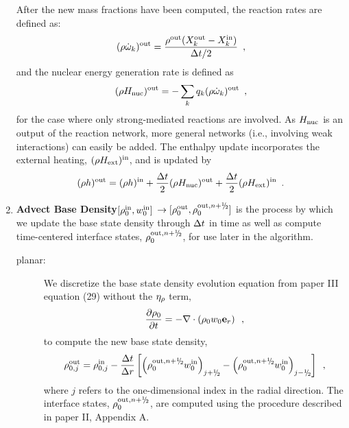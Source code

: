 \begin{enumerate}
After the new mass fractions have been computed, the reaction rates are defined as:
\begin{equation}
(\rho\dot{\omega}_k)^{\mathrm{out}} = \frac{\rho^{\mathrm{out}} ( X_k^{\mathrm{out}} - X_k^{\mathrm{in}})}{\Delta t /2} \enskip,
\end{equation}
and the nuclear energy generation rate is defined as
\begin{equation}
(\rho{H_{\rm nuc}})^{\mathrm{out}} = -\sum_k q_k (\rho\dot{\omega}_k)^{\mathrm{out}} \enskip,
\end{equation}
for the case where only strong-mediated reactions are involved.  As
${H_{\rm nuc}}$ is an output of the reaction network, more general networks
(i.e., involving weak interactions) can easily be added.  The enthalpy
update incorporates the external heating, $(\rho{H_{\rm ext}})^{\mathrm{in}}$, and is
updated by
\begin{equation}
(\rho h)^{\mathrm{out}} = 
(\rho h)^{\mathrm{in}} + \frac{\Delta t}{2} (\rho{H_{\rm nuc}})^{\mathrm{out}} + \frac{\Delta t}{2} (\rho{H_{\rm ext}})^{\mathrm{in}}\enskip.
\end{equation}

\item {\bf Advect Base Density}$[\rho_0^{\mathrm{in}},w_0^{\mathrm{in}}]$
$\rightarrow [\rho_0^\outp,\rho_0^{\outp,n+\myhalf}]$
is the process by which we update the base state density through $\Delta t$ in time
as well as compute time-centered interface states, $\rho_0^{\outp,n+\myhalf}$, 
for use later in the algorithm.
\begin{description}

\item[planar:] We discretize the base state density evolution 
equation from paper III equation (29) without the $\eta_{\rho}$ term,
\begin{equation}
\frac{\partial \rho_0}{\partial t} = - \nabla \cdot \left( \rho_0 w_0 {\bf e}_r \right)
\enskip ,
\label{eq:rho0upd_new}
\end{equation}
to compute the new base state density,
\begin{equation}
\rho_{0,j}^{\outp} = \rho_{0,j}^{\inp} - \frac{\dt}{\dr} 
\left [ \left( \rho_0^{\outp,\nph} w_0^{\inp}\right)_{j+\myhalf} -  
         \left( \rho_0^{\outp,\nph} w_0^{\inp}\right)_{j-\myhalf} \right ] \enskip,
\end{equation}
where $j$ refers to the one-dimensional index in the radial direction.
The interface states, $\rho_0^{\outp,\nph}$, are computed using the
procedure described in paper II, Appendix A.\\


\end{description}
\end{enumerate}
